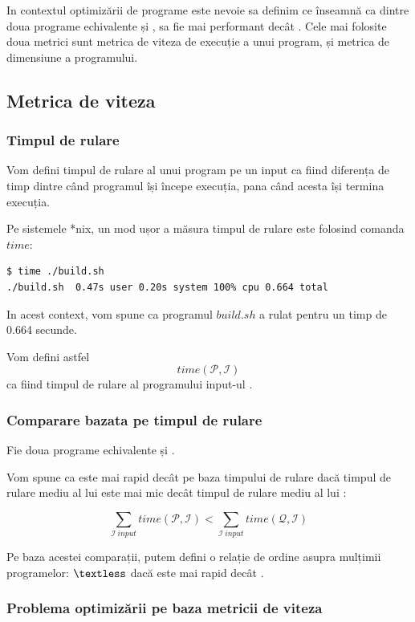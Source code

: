 In contextul optimizării de programe este nevoie sa definim ce
înseamnă ca dintre doua programe echivalente  și , 
sa fie mai performant decât .
Cele mai folosite doua metrici sunt metrica de viteza de
execuție a unui program, și metrica de dimensiune a programului.

\subsection{Metrica de viteza}

\subsubsection{Timpul de rulare}

Vom defini timpul de rulare al unui program  pe un input
 ca fiind diferența de timp dintre când programul își începe
execuția, pana când acesta își termina execuția.

Pe sistemele *nix, un mod ușor a măsura timpul de rulare este
folosind comanda $time$:

\begin{lstlisting}[language=Bash]
$ time ./build.sh
./build.sh  0.47s user 0.20s system 100% cpu 0.664 total
\end{lstlisting}

In acest context, vom spune ca programul $build.sh$ a rulat
pentru un timp de 0.664 secunde.

Vom defini astfel \[time(\mathcal{P}, \mathcal{I})\] ca fiind
timpul de rulare al programului  input-ul .

\subsubsection{Comparare bazata pe timpul de rulare}

Fie doua programe echivalente  și .

Vom spune ca  este mai rapid decât  pe baza timpului de
rulare dacă timpul de rulare mediu al lui  este mai mic
decât timpul de rulare mediu al lui :

\[
	\sum_{\mathcal{I} \ input} time(\mathcal{P}, \mathcal{I}) <
	\sum_{\mathcal{I} \ input} time(\mathcal{Q}, \mathcal{I})
\]

Pe baza acestei comparații, putem defini o relație de ordine
asupra mulțimii programelor:  $\textless$  dacă 
este mai rapid decât .

\subsubsection{Problema optimizării pe baza metricii de viteza}

